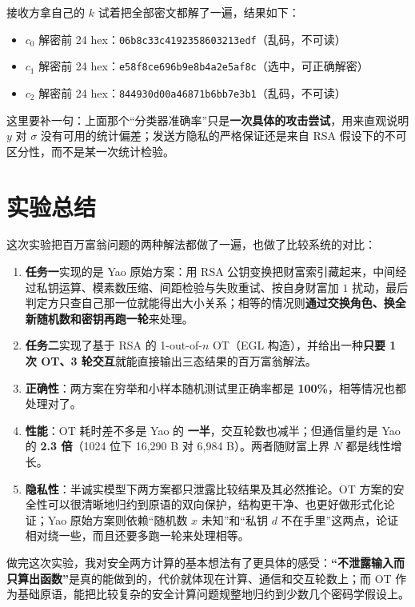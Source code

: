 \documentclass{SYSUReport}
\begin{document}
接收方拿自己的 $k$ 试着把全部密文都解了一遍，结果如下：
\begin{itemize}
\item $c_{0}$ 解密前 24 hex：\texttt{06b8c33c4192358603213edf}（乱码，不可读）
\item $c_{1}$ 解密前 24 hex：\texttt{e58f8ce696b9e8b4a2e5af8c}（选中，可正确解密）
\item $c_{2}$ 解密前 24 hex：\texttt{844930d00a46871b6bb7e3b1}（乱码，不可读）
\end{itemize}

这里要补一句：上面那个“分类器准确率”只是\textbf{一次具体的攻击尝试}，用来直观说明 $y$ 对 $\sigma$ 没有可用的统计偏差；发送方隐私的严格保证还是来自 RSA 假设下的不可区分性，而不是某一次统计检验。

\section{实验总结}
这次实验把百万富翁问题的两种解法都做了一遍，也做了比较系统的对比：

\begin{enumerate}
    \item \textbf{任务一}实现的是 Yao 原始方案：用 RSA 公钥变换把财富索引藏起来，中间经过私钥运算、模素数压缩、间距检验与失败重试、按自身财富加 $1$ 扰动，最后判定方只查自己那一位就能得出大小关系；相等的情况则\textbf{通过交换角色、换全新随机数和密钥再跑一轮}来处理。
    \item \textbf{任务二}实现了基于 RSA 的 1-out-of-$n$ OT（EGL 构造），并给出一种\textbf{只要 1 次 OT、3 轮交互}就能直接输出三态结果的百万富翁解法。
    \item \textbf{正确性}：两方案在穷举和小样本随机测试里正确率都是 \textbf{100\%}，相等情况也都处理对了。
    \item \textbf{性能}：OT 耗时差不多是 Yao 的 \textbf{一半}，交互轮数也减半；但通信量约是 Yao 的 \textbf{2.3 倍}（1024 位下 16,290 B 对 6,984 B）。两者随财富上界 $N$ 都是线性增长。
    \item \textbf{隐私性}：半诚实模型下两方案都只泄露比较结果及其必然推论。OT 方案的安全性可以很清晰地归约到原语的双向保护，结构更干净、也更好做形式化论证；Yao 原始方案则依赖“随机数 $x$ 未知”和“私钥 $d$ 不在手里”这两点，论证相对绕一些，而且还要多跑一轮来处理相等。
\end{enumerate}

做完这次实验，我对安全两方计算的基本想法有了更具体的感受：\textbf{“不泄露输入而只算出函数”}是真的能做到的，代价就体现在计算、通信和交互轮数上；而 OT 作为基础原语，能把比较复杂的安全计算问题规整地归约到少数几个密码学假设上。
\end{document}
